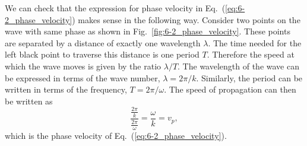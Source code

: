We can check that the expression for phase velocity in Eq.~(\ref{eq:6-2_phase_velocity}) makes sense in the following way.
Consider two points on the wave with same phase as shown in Fig.~\ref{fig:6-2_phase_velocity}.
These points are separated by a distance of exactly one wavelength $\lambda$.
The time needed for the left black point to traverse this distance is one period $T$.
Therefore the speed at which the wave moves is given by the ratio $\lambda / T$.
The wavelength of the wave can be expressed in terms of the wave number, $\lambda = 2\pi / k$.
Similarly, the period can be written in terms of the frequency, $T = 2\pi / \omega$.
The speed of propagation can then be written as
\begin{equation}
    \frac{\frac{2\pi}{k}}{\frac{2\pi}{\omega}} = \frac{\omega}{k} = v_p,
\end{equation}
which is the phase velocity of Eq.~(\ref{eq:6-2_phase_velocity}).


